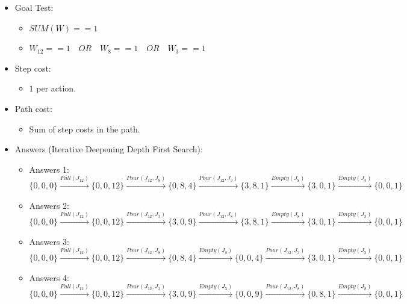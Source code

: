\documentclass[12pt, a4paper]{article}
\begin{document}
\begin{enumerate}
\begin{itemize}
\begin{itemize}
		\end{itemize}
	
		\item Goal Test:
		\begin{itemize}
			\item $SUM(W) == 1$
			\item $W_{12} == 1 \quad OR\quad W_{8} == 1 \quad OR\quad W_{3} == 1 $
		\end{itemize}
		\item Step cost:
		\begin{itemize}
			\item $1$ per action.
		\newpage
		\end{itemize}
		\item Path cost:
		\begin{itemize}
			\item Sum of step costs in the path.
		\end{itemize}
		\item Answers (Iterative Deepening Depth First Search):
		\begin{itemize}
			\item Answers 1:\\
			$\{0, 0, 0\} \xrightarrow{Full(J_{12})} \{0, 0, 12\} \xrightarrow{Pour(J_{12}, J_{8})} \{0,8,4\} \xrightarrow{Pour(J_{12}, J_{3})} \{3,8,1\} \xrightarrow{Empty(J_{8})} \{3,0,1\} \xrightarrow{Empty(J_{3})} \{0,0,1\}$\\ 
			
			\item Answers 2:\\
			$\{0, 0, 0\} \xrightarrow{Full(J_{12})} \{0, 0, 12\} \xrightarrow{Pour(J_{12}, J_{3})} \{3,0,9\}
			\xrightarrow{Pour(J_{12}, J_{8})} \{3,8,1\} \xrightarrow{Empty(J_{8})} \{3,0,1\} \xrightarrow{Empty(J_{3})} \{0,0,1\}$\\
			
			\item Answers 3:\\
			$\{0, 0, 0\} \xrightarrow{Full(J_{12})} \{0, 0, 12\} \xrightarrow{Pour(J_{12}, J_{8})} \{0,8,4\}
			\xrightarrow{Empty(J_{8})} \{0,0,4\} \xrightarrow{Pour(J_{12}, J_{3})} \{3,0,1\} \xrightarrow{Empty(J_{3})} \{0,0,1\}$\\
			
			\item Answers 4:\\
			$\{0, 0, 0\} \xrightarrow{Full(J_{12})} \{0, 0, 12\} \xrightarrow{Pour(J_{12}, J_{3})} \{3,0,9\} \xrightarrow{Empty(J_{3})} \{0,0,9\} \xrightarrow{Pour(J_{12}, J_{8})} \{0,8,1\} \xrightarrow{Empty(J_{8})} \{0,0,1\}$\\
		\end{itemize}
		\end{itemize}
	

\end{enumerate}
\end{document}
